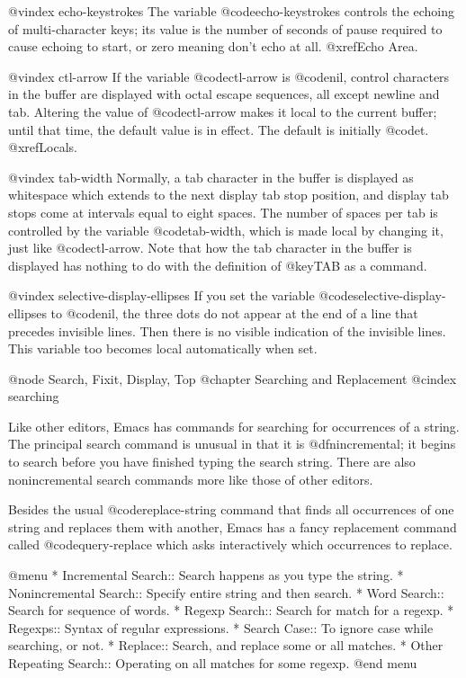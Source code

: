 {{{{{{{{@vindex echo-keystrokes
  The variable @code{echo-keystrokes} controls the echoing of multi-character
keys; its value is the number of seconds of pause required to cause echoing
to start, or zero meaning don't echo at all.  @xref{Echo Area}.

@vindex ctl-arrow
  If the variable @code{ctl-arrow} is @code{nil}, control characters in the
buffer are displayed with octal escape sequences, all except newline and
tab.  Altering the value of @code{ctl-arrow} makes it local to the current
buffer; until that time, the default value is in effect.  The default is
initially @code{t}.  @xref{Locals}.

@vindex tab-width
  Normally, a tab character in the buffer is displayed as whitespace which
extends to the next display tab stop position, and display tab stops come
at intervals equal to eight spaces.  The number of spaces per tab is
controlled by the variable @code{tab-width}, which is made local by
changing it, just like @code{ctl-arrow}.  Note that how the tab character
in the buffer is displayed has nothing to do with the definition of
@key{TAB} as a command.

@vindex selective-display-ellipses
  If you set the variable @code{selective-display-ellipses} to @code{nil},
the three dots do not appear at the end of a line that precedes invisible
lines.  Then there is no visible indication of the invisible lines.
This variable too becomes local automatically when set.

@node Search, Fixit, Display, Top
@chapter Searching and Replacement
@cindex searching

  Like other editors, Emacs has commands for searching for occurrences of
a string.  The principal search command is unusual in that it is
@dfn{incremental}; it begins to search before you have finished typing the
search string.  There are also nonincremental search commands more like
those of other editors.

  Besides the usual @code{replace-string} command that finds all
occurrences of one string and replaces them with another, Emacs has a fancy
replacement command called @code{query-replace} which asks interactively
which occurrences to replace.

@menu
* Incremental Search::     Search happens as you type the string.
* Nonincremental Search::  Specify entire string and then search.
* Word Search::            Search for sequence of words.
* Regexp Search::          Search for match for a regexp.
* Regexps::                Syntax of regular expressions.
* Search Case::            To ignore case while searching, or not.
* Replace::                Search, and replace some or all matches.
* Other Repeating Search:: Operating on all matches for some regexp.
@end menu

}}}}}}}}
